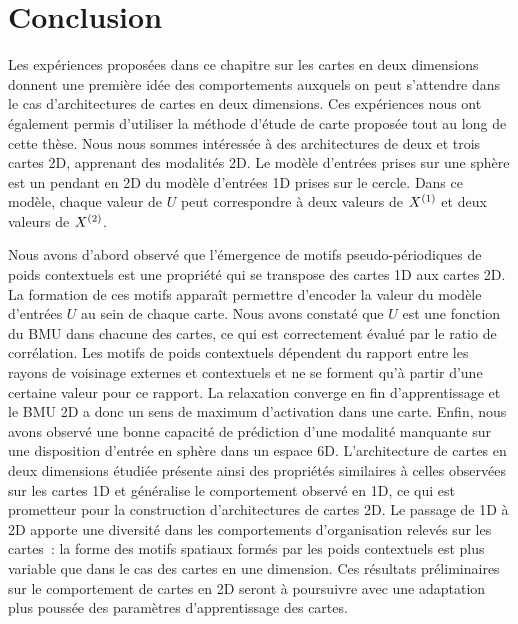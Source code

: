 \documentclass[../main]{subfiles}
\begin{document}
\section{Conclusion}

Les expériences proposées dans ce chapitre sur les cartes en deux dimensions donnent une  première idée des comportements auxquels on peut s'attendre dans le cas d'architectures de cartes en deux dimensions.
Ces expériences nous ont également permis d'utiliser la méthode d'étude de carte proposée tout au long de cette thèse.
Nous nous sommes intéressée à des architectures de deux et trois cartes 2D, apprenant des modalités 2D. Le modèle d'entrées prises sur une sphère est un pendant en 2D du modèle d'entrées 1D prises sur le cercle. Dans ce modèle, chaque valeur de $U$ peut correspondre à deux valeurs de $X^{({1})}$ et deux valeurs de $X^{({2})}$.

Nous avons d'abord observé que l'émergence de motifs pseudo-périodiques de poids contextuels est une propriété qui se transpose des cartes 1D aux cartes 2D. 
La formation de ces motifs apparaît permettre d'encoder la valeur du modèle d'entrées $U$ au sein de chaque carte. Nous avons constaté que $U$ est une fonction du BMU dans chacune des cartes, ce qui est correctement évalué par le ratio de corrélation.
Les motifs de poids contextuels dépendent du rapport entre les rayons de voisinage externes et contextuels et ne se forment qu'à partir d'une certaine valeur pour ce rapport.
La relaxation converge en fin d'apprentissage et le BMU 2D a donc un sens de maximum d'activation dans une carte. Enfin, nous avons observé une bonne capacité de prédiction d'une modalité manquante sur une disposition d'entrée en sphère dans un espace 6D.
L'architecture de cartes en deux dimensions étudiée présente ainsi des propriétés similaires à celles observées sur les cartes 1D et généralise le comportement observé en 1D, ce qui est prometteur pour la construction d'architectures de cartes 2D. Le passage de 1D à 2D apporte une diversité dans les comportements d'organisation relevés sur les cartes~: la forme des motifs spatiaux formés par les poids contextuels est plus variable que dans le cas des cartes en une dimension.
Ces résultats préliminaires sur le comportement de cartes en 2D seront à poursuivre avec une adaptation plus poussée des paramètres d'apprentissage des cartes.



\ifSubfilesClassLoaded{
    \printbibliography
}{}
\end{document}
